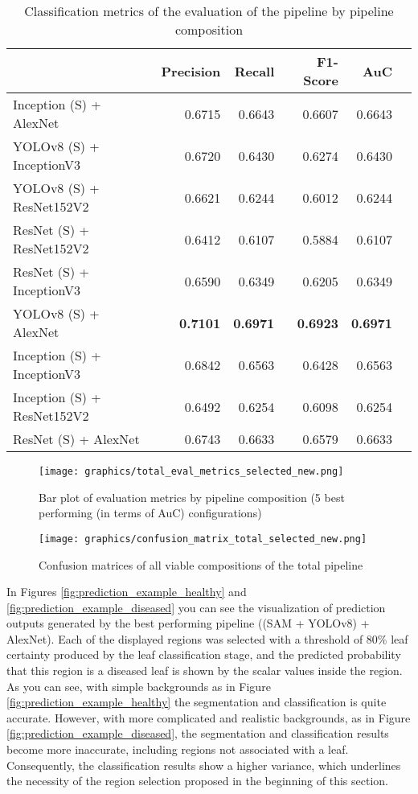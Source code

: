 \documentclass[draft,final]{vutinfth} %
\begin{document}
\begin{table}[]
    \centering
    \begin{tabular}{lrrrrr}
    \toprule
     & Precision & Recall & F1-Score & AuC \\
    \midrule
    Inception (S) + AlexNet & 0.6715 & 0.6643 & 0.6607 & 0.6643 \\
    YOLOv8 (S) + InceptionV3 & 0.6720 & 0.6430 & 0.6274 & 0.6430 \\
    YOLOv8 (S) + ResNet152V2 & 0.6621 & 0.6244 & 0.6012 & 0.6244 \\
    ResNet (S) + ResNet152V2 & 0.6412 & 0.6107 & 0.5884 & 0.6107 \\
    ResNet (S) + InceptionV3 & 0.6590 & 0.6349 & 0.6205 & 0.6349 \\
    YOLOv8 (S) + AlexNet & \textbf{0.7101} & \textbf{0.6971} & \textbf{0.6923} & \textbf{0.6971} \\
    Inception (S) + InceptionV3 & 0.6842 & 0.6563 & 0.6428 & 0.6563 \\
    Inception (S) + ResNet152V2 & 0.6492 & 0.6254 & 0.6098 & 0.6254 \\
    ResNet (S) + AlexNet & 0.6743 & 0.6633 & 0.6579 & 0.6633 \\
    \bottomrule
    \end{tabular}
    \caption{Classification metrics of the evaluation of the pipeline by pipeline composition}
    \label{tab:total_eval}
\end{table}

\begin{figure}[ht]
    \centering
    \texttt{[image: graphics/total\_eval\_metrics\_selected\_new.png]}
    \caption{Bar plot of evaluation metrics by pipeline composition (5 best performing (in terms of AuC) configurations)}
    \label{fig:total_top5_eval_metrics}
\end{figure}

\begin{figure}[h]
    \centering
    \texttt{[image: graphics/confusion\_matrix\_total\_selected\_new.png]}
    \caption{Confusion matrices of all viable compositions of the total pipeline}
    \label{fig:total_confusion_matrices}
\end{figure}

In Figures \ref{fig:prediction_example_healthy} and \ref{fig:prediction_example_diseased} you can see the visualization of prediction outputs generated by the best performing pipeline ((SAM + YOLOv8) + AlexNet). Each of the displayed regions was selected with a threshold of 80\% leaf certainty produced by the leaf classification stage, and the predicted probability that this region is a diseased leaf is shown by the scalar values inside the region. As you can see, with simple backgrounds as in Figure \ref{fig:prediction_example_healthy} the segmentation and classification is quite accurate. However, with more complicated and realistic backgrounds, as in Figure \ref{fig:prediction_example_diseased}, the segmentation and classification results become more inaccurate, including regions not associated with a leaf. Consequently, the classification results show a higher variance, which underlines the necessity of the region selection proposed in the beginning of this section.
\end{document}
